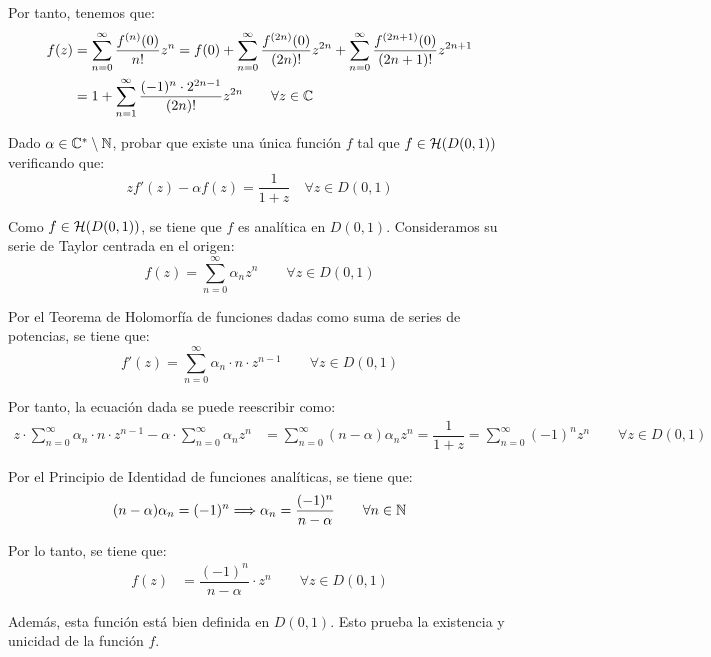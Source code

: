 \begin{ejercicio}
\begin{enumerate}
        Por tanto, tenemos que:
        \begin{align*}
            f(z) &= \sum_{n=0}^{\infty} \dfrac{f^{(n)}(0)}{n!}z^n
            = f(0) + \sum_{n=0}^{\infty} \dfrac{f^{(2n)}(0)}{(2n)!}z^{2n} + \sum_{n=0}^{\infty} \dfrac{f^{(2n+1)}(0)}{(2n+1)!}z^{2n+1}\\
            &= 1+\sum_{n=1}^{\infty} \dfrac{(-1)^{n}\cdot 2^{2n-1}}{(2n)!}z^{2n}\qquad \forall z \in \mathbb{C}
        \end{align*}
    \end{enumerate}
\end{ejercicio}

\begin{ejercicio}
    Dado $\alpha \in \mathbb{C}^*\setminus \mathbb{N}$, probar que existe una única función $f$ tal que $f \in \mathcal{H}(D(0,1))$ verificando que:
    \begin{equation*}
        z f'(z) - \alpha f(z) = \frac{1}{1+z} \quad \forall z \in D(0,1)
    \end{equation*}

    Como $f\in \mathcal{H}(D(0,1))$, se tiene que $f$ es analítica en $D(0,1)$. Consideramos su serie de Taylor centrada en el origen:
    \begin{equation*}
        f(z) = \sum_{n=0}^{\infty} \alpha_n z^n \qquad \forall z \in D(0,1)
    \end{equation*}

    Por el Teorema de Holomorfía de funciones dadas como suma de series de potencias, se tiene que:
    \begin{equation*}
        f'(z) = \sum_{n=0}^{\infty} \alpha_n\cdot n\cdot z^{n-1} \qquad \forall z \in D(0,1)
    \end{equation*}

    Por tanto, la ecuación dada se puede reescribir como:
    \begin{align*}
        z\cdot \sum_{n=0}^{\infty} \alpha_n\cdot n\cdot z^{n-1} - \alpha\cdot \sum_{n=0}^{\infty} \alpha_n z^n &= \sum_{n=0}^{\infty} (n-\alpha)\alpha_n z^n
        = \dfrac{1}{1+z}=\sum_{n=0}^{\infty} (-1)^n z^n \qquad \forall z \in D(0,1)
    \end{align*}

    Por el Principio de Identidad de funciones analíticas, se tiene que:
    \begin{equation*}
        (n-\alpha)\alpha_n = (-1)^n\Longrightarrow
        \alpha_n = \frac{(-1)^n}{n-\alpha} \qquad \forall n \in \mathbb{N}
    \end{equation*}

    Por lo tanto, se tiene que:
    \begin{align*}
        f(z) &= \dfrac{(-1)^n}{n-\alpha}\cdot z^n\qquad \forall z \in D(0,1)
    \end{align*}

    Además, esta función está bien definida en $D(0,1)$. Esto prueba la existencia y unicidad de la función $f$.    
\end{ejercicio}

